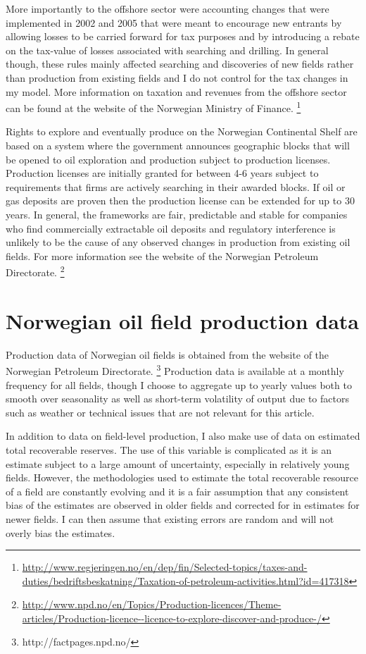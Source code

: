 \documentclass[12pt]{article}
\begin{document}
More importantly to the offshore sector were accounting changes that were implemented in 2002 and 2005 that were meant to encourage new entrants by allowing losses to be carried forward for tax purposes and by introducing a rebate on the tax-value of losses associated with searching and drilling.  In general though, these rules mainly affected searching and discoveries of new fields rather than production from existing fields and I do not control for the tax changes in my model.  More information on taxation and revenues from the offshore sector can be found at the website of the Norwegian Ministry of Finance. \footnote{\url{http://www.regjeringen.no/en/dep/fin/Selected-topics/taxes-and-duties/bedriftsbeskatning/Taxation-of-petroleum-activities.html?id=417318}}

Rights to explore and eventually produce on the Norwegian Continental Shelf are based on a system where the government announces geographic blocks that will be opened to oil exploration and production subject to production licenses.  Production licenses are initially granted for between 4-6 years subject to requirements that firms are actively searching in their awarded blocks.  If oil or gas deposits are proven then the production license can be extended for up to 30 years.  In general, the frameworks are fair, predictable and stable for companies who find commercially extractable oil deposits and regulatory interference is unlikely to be the cause of any observed changes in production from existing oil fields.  For more information see the website of the Norwegian Petroleum Directorate. \footnote{\url{http://www.npd.no/en/Topics/Production-licences/Theme-articles/Production-licence--licence-to-explore-discover-and-produce-/}}

\section{Norwegian oil field production data}
Production data of Norwegian oil fields is obtained from the website of the Norwegian Petroleum Directorate. \footnote{http://factpages.npd.no/}  Production data is available at a monthly frequency for all fields, though I choose to aggregate up to yearly values both to smooth over seasonality as well as short-term volatility of output due to factors such as weather or technical issues that are not relevant for this article.  

In addition to data on field-level production, I also make use of data on estimated total recoverable reserves.  The use of this variable is complicated as it is an estimate subject to a large amount of uncertainty, especially in relatively young fields.  However, the methodologies used to estimate the total recoverable resource of a field are constantly evolving and it is a fair assumption that any consistent bias of the estimates are observed in older fields and corrected for in estimates for newer fields.  I can then assume that existing errors are random and will not overly bias the estimates.  
\end{document}

